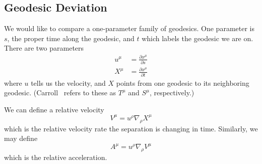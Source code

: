 \subsection{Geodesic Deviation}
We would like to compare a one-parameter family of geodesics. One
parameter is $s$, the proper time along the geodesic, and $t$
which labels the geodesic we are on. There are two parameters
\begin{subequations}
\begin{align}
u^{\mu} &= \frac{\partial x^{\mu}}{\partial s}\\
X^{\mu} &= \frac{\partial x^{\mu}}{\partial t}
\end{align}
\end{subequations}
where $u$ tells us the velocity, and $X$ points from one geodesic
to its neighboring geodesic. (Carroll~\cite{Carroll:2004st} refers to these as
$T^{\mu}$ and $S^{\mu}$, respectively.)

We can define a relative velocity
\begin{equation}\label{eq:defnRelativeVelocity}
V^{\mu} = u^{\rho}\nabla_{\rho}X^{\mu}
\end{equation}
which is the relative velocity rate the separation is changing
in time. Similarly, we may define
\begin{equation}
A^{\mu} = u^{\rho}\nabla_{\rho}V^{\mu}
\end{equation}
which is the relative acceleration.

